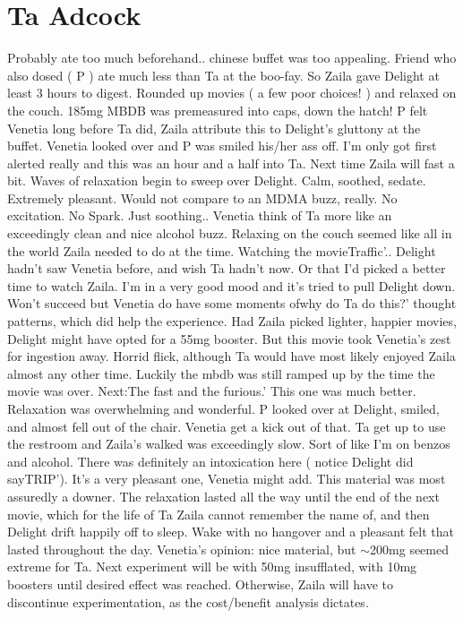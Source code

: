 \documentclass[12pt]{book}
\begin{document}
\chapter{Ta Adcock}

Probably ate too much beforehand.. chinese buffet was too appealing. Friend who also dosed ( P ) ate much less than Ta at the boo-fay. So Zaila gave Delight at least 3 hours to digest. Rounded up movies ( a few poor choices! ) and relaxed on the couch. 185mg MBDB was premeasured into caps, down the hatch! P felt Venetia long before Ta did, Zaila attribute this to Delight's gluttony at the buffet. Venetia looked over and P was smiled his/her ass off. I'm only got first alerted really and this was an hour and a half into Ta. Next time Zaila will fast a bit. Waves of relaxation begin to sweep over Delight. Calm, soothed, sedate. Extremely pleasant. Would not compare to an MDMA buzz, really. No excitation. No Spark. Just soothing.. Venetia think of Ta more like an exceedingly clean and nice alcohol buzz. Relaxing on the couch seemed like all in the world Zaila needed to do at the time. Watching the movieTraffic'.. Delight hadn't saw Venetia before, and wish Ta hadn't now. Or that I'd picked a better time to watch Zaila. I'm in a very good mood and it's tried to pull Delight down. Won't succeed but Venetia do have some moments ofwhy do Ta do this?' thought patterns, which did help the experience. Had Zaila picked lighter, happier movies, Delight might have opted for a 55mg booster. But this movie took Venetia's zest for ingestion away. Horrid flick, although Ta would have most likely enjoyed Zaila almost any other time. Luckily the mbdb was still ramped up by the time the movie was over. Next:The fast and the furious.' This one was much better. Relaxation was overwhelming and wonderful. P looked over at Delight, smiled, and almost fell out of the chair. Venetia get a kick out of that. Ta get up to use the restroom and Zaila's walked was exceedingly slow. Sort of like I'm on benzos and alcohol. There was definitely an intoxication here ( notice Delight did sayTRIP'). It's a very pleasant one, Venetia might add. This material was most assuredly a downer. The relaxation lasted all the way until the end of the next movie, which for the life of Ta Zaila cannot remember the name of, and then Delight drift happily off to sleep. Wake with no hangover and a pleasant felt that lasted throughout the day. Venetia's opinion: nice material, but $\sim$200mg seemed extreme for Ta. Next experiment will be with 50mg insufflated, with 10mg boosters until desired effect was reached. Otherwise, Zaila will have to discontinue experimentation, as the cost/benefit analysis dictates.
\end{document}
